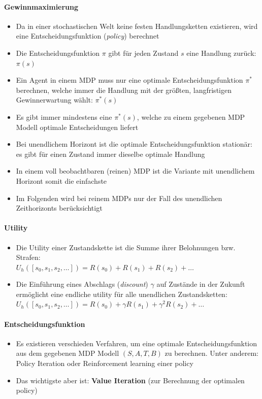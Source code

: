 \paragraph{Gewinnmaximierung}
\begin{itemize}
	\item Da in einer stochastischen Welt keine festen Handlungsketten existieren, wird eine Entscheidungsfunktion (\emph{policy}) berechnet
	\item Die Entscheidungsfunktion $\pi$ gibt f\"ur jeden Zustand $s$ eine Handlung zur\"uck: $\pi(s)$
	\item Ein Agent in einem MDP muss nur eine optimale Entscheidungsfunktion $\pi^*$ berechnen, welche immer die Handlung mit der gr\"o{\ss}ten, langfristigen Gewinnerwartung w\"ahlt: $\pi^* (s)$
	\item Es gibt immer mindestens eine $\pi^* (s)$, welche zu einem gegebenen MDP Modell optimale Entscheidungen liefert
	\item Bei unendlichem Horizont ist die optimale Entscheidungsfunktion station\"ar: es gibt f\"ur einen Zustand immer dieselbe optimale Handlung
	\item In einem voll beobachtbaren (reinen) MDP ist die Variante mit unendlichem Horizont somit die einfachste
	\item Im Folgenden wird bei reinem MDPs nur der Fall des unendlichen Zeithorizonts ber\"ucksichtigt
\end{itemize}

\paragraph{Utility}
\begin{itemize}
	\item Die Utility einer Zustandskette ist die Summe ihrer Belohnungen bzw. Strafen:\\ $U_h(\left[s_0, s_1, s_2, \ldots \right]) = R(s_0) + R(s_1) + R(s_2) + \ldots$
	\item Die Einf\"uhrung eines Abschlags (\emph{discount}) $\gamma$ auf Zust\"ande  in der Zukunft erm\"oglicht eine endliche utility f\"ur alle unendlichen Zustandsketten:\\ $U_h(\left[s_0, s_1, s_2, \ldots \right]) = R(s_0) + \gamma R(s_1) + \gamma^2 R(s_2) + \ldots$
\end{itemize}

\paragraph{Entscheidungsfunktion}
\begin{itemize}
	\item Es existieren verschieden Verfahren, um eine optimale Entscheidungsfunktion aus dem gegebenen MDP Modell $(S, A, T, B)$ zu berechnen.
	Unter anderem: Policy Iteration oder Reinforcement learning einer policy
	\item Das wichtigste aber ist: \textbf{Value Iteration} (zur Berechnung der optimalen policy)
\end{itemize}

